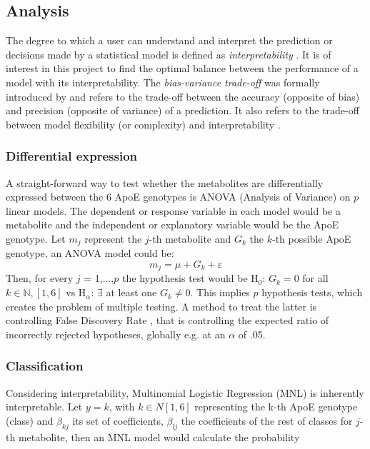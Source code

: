 \documentclass{amsart}
\theoremstyle{plain}
\begin{document}
\subsection{Analysis}
The degree to which a user can understand and interpret the prediction or decisions made by a statistical model is defined as \textit{interpretability} \cite{Elshawi2019OnHypertension}. It is of interest in this project to find the optimal balance between the performance of a model with its interpretability. The \textit{bias-variance trade-off} was formally introduced by \citeauthor{Geman1992NeuralDilemma} and refers to the trade-off between the accuracy (opposite of bias) and precision (opposite of variance) of a prediction. It also refers to the trade-off between model flexibility (or complexity) and interpretability \cite{Geman1992NeuralDilemma}.
\subsubsection{Differential expression}
A straight-forward way to test whether the metabolites are differentially expressed between the 6 ApoE genotypes is ANOVA (Analysis of Variance) on $p$ linear models. The dependent or response variable in each model would be a metabolite and the independent or explanatory variable would be the ApoE genotype. Let $m_j$ represent the $j$-th metabolite and $G_k$ the $k$-th possible ApoE genotype, an ANOVA model could be:
\[m_j = \mu + G_k +\varepsilon \]
Then, for every $j$ = 1,...,$p$ the hypothesis test would be H$_0$: $G_k=0$ for all $k\in \mathbb{N}, [1,6]$ vs H$_\alpha$: $\exists$ at least one $G_k\neq0$. This implies $p$ hypothesis tests, which creates the problem of multiple testing. A method to treat the latter is controlling False Discovery Rate \cite{Benjamini1995ControllingTesting}, that is controlling the expected ratio of incorrectly rejected hypotheses, globally e.g. at an $\alpha$ of .05.

\subsubsection{Classification}

Considering interpretability, Multinomial Logistic Regression (MNL) is inherently interpretable. Let $y = k$, with $k \in N[1,6]$ representing the k-th ApoE genotype (class) and $\beta_{kj}$ its set of coefficients,  $\beta_{lj}$ the coefficients of the rest of classes for $j$-th metabolite, then an MNL model would calculate the probability
\end{document}
